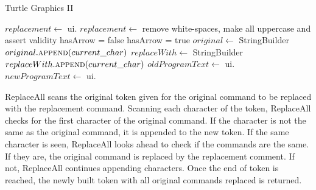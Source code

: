 \documentclass[12pt]{article}
\begin{document}
\begin{algorithm}[H]
\caption{Turtle Graphics II}
\begin{algorithmic}
        \State $replacement \gets$ ui.
        \State $replacement \gets$ remove white-spaces, make all uppercase and assert validity
        \State hasArrow = false
                \State hasArrow = true
            \EndIf
        \EndFor
        \EndIf
        \State $original \gets$ StringBuilder
                \State {}
            \Else
                \State $original.\Call{append}{current\_char}$
            \EndIf
        \EndFor
        \State $replaceWith \gets$ StringBuilder
            \State $replaceWith.\Call{append}{current\_char}$
        \EndFor
        \State $oldProgramText \gets$ ui.
        \State $newProgramText \gets$ 
        \State ui.
    \EndProcedure
\end{algorithmic}
\end{algorithm}

ReplaceAll scans the original token given for the original command to be replaced with the
replacement command. Scanning each character of the token, ReplaceAll checks for the first
character of the original command. If the character is not the same as the original command,
it is appended to the new token. If the same character is seen, ReplaceAll looks ahead to
check if the commands are the same. If they are, the original command is replaced by the
replacement comment. If not, ReplaceAll continues appending characters. Once the end of
token is reached, the newly built token with all original commands replaced is returned.
\end{document}
